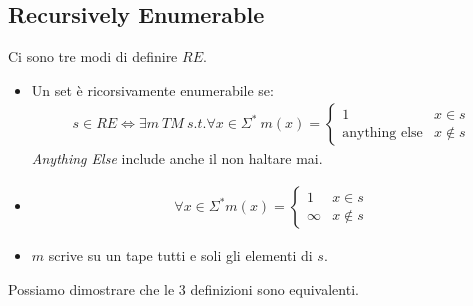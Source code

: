 \documentclass{article}
\begin{document}
\subsection{Recursively Enumerable}
Ci sono tre modi di definire $RE$.
\begin{itemize}
    \item Un set è ricorsivamente enumerabile se:
        \begin{align*}
            s\in RE \iff \exists m\ TM\ s.t. \forall x\in\Sigma^*\ m(x)=\begin{cases}1&x\in s \\ \text{anything else} & x\not\in s\end{cases}
        \end{align*}
        \textit{Anything Else} include anche il non haltare mai.

    \item
        \begin{align*}
            \forall x\in\Sigma^* m(x)=\begin{cases}1&x\in s \\ \infty & x\not\in s\end{cases}
        \end{align*}

    \item $m$ scrive su un tape tutti e soli gli elementi di $s$.
\end{itemize}
Possiamo dimostrare che le 3 definizioni sono equivalenti.
\end{document}
